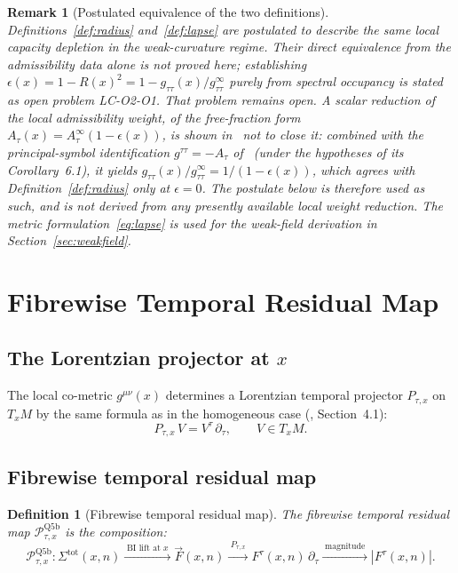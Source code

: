 \documentclass[11pt,a4paper]{article}
\newtheorem{definition}[theorem]{Definition}
\newtheorem{remark}[theorem]{Remark}
\begin{document}
    \begin{remark}[Postulated equivalence of the two definitions]\label{rem:equiv}
      Definitions~\ref{def:radius} and~\ref{def:lapse} are postulated to describe the same
      local capacity depletion in the weak-curvature regime.
      Their direct equivalence from the admissibility data alone is not proved here;
      establishing $\epsilon(x) = 1-R(x)^2 = 1-g_{\tau\tau}(x)/g_{\tau\tau}^\infty$ purely from spectral occupancy
      is stated as open problem LC-O2-O1.
      That problem remains open.
      A scalar reduction of the local admissibility weight, of the free-fraction form
      $A_\tau(x) = A_\tau^\infty(1-\epsilon(x))$, is shown in~\cite{Beau2026lco2o1} not to close it:
      combined with the principal-symbol identification $g^{\tau\tau} = -A_\tau$
      of~\cite{Beau2026q11} (under the hypotheses of its Corollary~6.1), it yields
      $g_{\tau\tau}(x)/g_{\tau\tau}^\infty = 1/(1-\epsilon(x))$,
      which agrees with Definition~\ref{def:radius} only at $\epsilon = 0$.
      The postulate below is therefore used as such, and is not derived from any presently
      available local weight reduction.
      The metric formulation~\eqref{eq:lapse} is used for the weak-field derivation
      in Section~\ref{sec:weakfield}.
    \end{remark}

  \section{Fibrewise Temporal Residual Map}\label{sec:main}

  \subsection{The Lorentzian projector at $x$}

    The local co-metric $g^{\mu\nu}(x)$ determines a Lorentzian temporal projector
    $P_{\tau,x}$ on $T_x M$ by the same formula as in the homogeneous case
    (\cite{Beau2026tp}, Section~4.1):
    \begin{equation}\label{eq:Ptau-local}
      P_{\tau,x}\,V = V^\tau\,\partial_\tau, \qquad V \in T_x M.
    \end{equation}

  \subsection{Fibrewise temporal residual map}

    \begin{definition}[Fibrewise temporal residual map]\label{def:Ptau-local}
      The \emph{fibrewise temporal residual map} $\mathcal{P}_{\tau,x}^{\mathrm{Q5b}}$
      is the composition:
      \[
        \mathcal{P}_{\tau,x}^{\mathrm{Q5b}} \colon
        \Sigma^{\mathrm{tot}}(x,n)
        \xrightarrow{\;\text{BI lift at }x\;}
        \vec{F}(x,n)
        \xrightarrow{\;P_{\tau,x}\;}
        F^\tau(x,n)\,\partial_\tau
        \xrightarrow{\;\text{magnitude}\;}
        |F^\tau(x,n)|.
      \]
    \end{definition}
\end{document}
